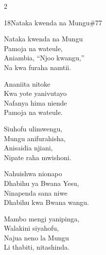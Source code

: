 \begin{multicols}{2}
\begin{hymn}{18}{Nataka kwenda na Mungu}{\#77}
\begin{stanza}
Nataka kwenda na Mungu\\
Pamoja na wateule,\\
Aniambia, ``Njoo kwangu,''\\
Na kwa furaha namtii.
\end{stanza}
\begin{chorus}
Ananiita nitoke\\
Kwa yote yanivutayo\\
Nafanya hima niende\\
Pamoja na wateule.
\end{chorus}
\begin{stanza}
Siuhofu ulimwengu,\\
Mungu anifurahisha,\\
Anisaidia njiani,\\
Nipate raha mwishoni.
\end{stanza}
\begin{stanza}
Nahuishwa nionapo\\
Dhabihu ya Bwana Yesu,\\
Ninapenda sana niwe\\
Dhabihu kwa Bwana wangu.
\end{stanza}
\begin{stanza}
Mambo mengi yanipinga,\\
Walakini siyahofu,\\
Najua neno la Mungu\\
Li thabiti, nitashinda.
\end{stanza}
\end{hymn}


\end{multicols}
